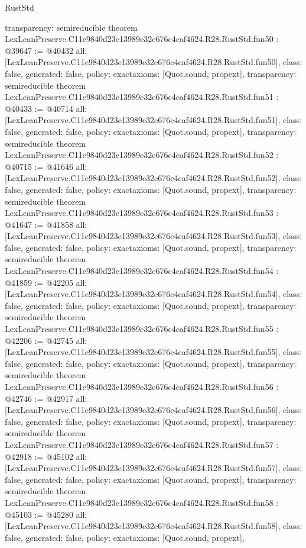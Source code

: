 \begin{lexlean}{RustStd}
\begin{coremodule}
{  transparency: semireducible
}
theorem LexLeanPreserve.C11e9840d23e13989e32e676c4caf4624.R28.RustStd.fun50 : @39647 := @40432 {
  all: [LexLeanPreserve.C11e9840d23e13989e32e676c4caf4624.R28.RustStd.fun50],
  class: false,
  generated: false,
  policy: exact{axioms: [Quot.sound, propext]},
  transparency: semireducible
}
theorem LexLeanPreserve.C11e9840d23e13989e32e676c4caf4624.R28.RustStd.fun51 : @40433 := @40714 {
  all: [LexLeanPreserve.C11e9840d23e13989e32e676c4caf4624.R28.RustStd.fun51],
  class: false,
  generated: false,
  policy: exact{axioms: [Quot.sound, propext]},
  transparency: semireducible
}
theorem LexLeanPreserve.C11e9840d23e13989e32e676c4caf4624.R28.RustStd.fun52 : @40715 := @41646 {
  all: [LexLeanPreserve.C11e9840d23e13989e32e676c4caf4624.R28.RustStd.fun52],
  class: false,
  generated: false,
  policy: exact{axioms: [Quot.sound, propext]},
  transparency: semireducible
}
theorem LexLeanPreserve.C11e9840d23e13989e32e676c4caf4624.R28.RustStd.fun53 : @41647 := @41858 {
  all: [LexLeanPreserve.C11e9840d23e13989e32e676c4caf4624.R28.RustStd.fun53],
  class: false,
  generated: false,
  policy: exact{axioms: [Quot.sound, propext]},
  transparency: semireducible
}
theorem LexLeanPreserve.C11e9840d23e13989e32e676c4caf4624.R28.RustStd.fun54 : @41859 := @42205 {
  all: [LexLeanPreserve.C11e9840d23e13989e32e676c4caf4624.R28.RustStd.fun54],
  class: false,
  generated: false,
  policy: exact{axioms: [Quot.sound, propext]},
  transparency: semireducible
}
theorem LexLeanPreserve.C11e9840d23e13989e32e676c4caf4624.R28.RustStd.fun55 : @42206 := @42745 {
  all: [LexLeanPreserve.C11e9840d23e13989e32e676c4caf4624.R28.RustStd.fun55],
  class: false,
  generated: false,
  policy: exact{axioms: [Quot.sound, propext]},
  transparency: semireducible
}
theorem LexLeanPreserve.C11e9840d23e13989e32e676c4caf4624.R28.RustStd.fun56 : @42746 := @42917 {
  all: [LexLeanPreserve.C11e9840d23e13989e32e676c4caf4624.R28.RustStd.fun56],
  class: false,
  generated: false,
  policy: exact{axioms: [Quot.sound, propext]},
  transparency: semireducible
}
theorem LexLeanPreserve.C11e9840d23e13989e32e676c4caf4624.R28.RustStd.fun57 : @42918 := @45102 {
  all: [LexLeanPreserve.C11e9840d23e13989e32e676c4caf4624.R28.RustStd.fun57],
  class: false,
  generated: false,
  policy: exact{axioms: [Quot.sound, propext]},
  transparency: semireducible
}
theorem LexLeanPreserve.C11e9840d23e13989e32e676c4caf4624.R28.RustStd.fun58 : @45103 := @45280 {
  all: [LexLeanPreserve.C11e9840d23e13989e32e676c4caf4624.R28.RustStd.fun58],
  class: false,
  generated: false,
  policy: exact{axioms: [Quot.sound, propext]},
}
\end{coremodule}
\end{lexlean}

